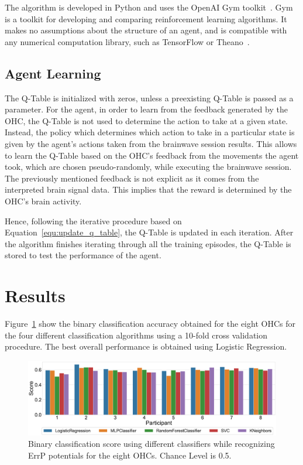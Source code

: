 \documentclass[journal]{IEEEtran}
\begin{document}
{{The algorithm is developed in Python and uses the OpenAI Gym toolkit~\cite{openai}. Gym is a toolkit for developing and comparing reinforcement learning algorithms. It makes no assumptions about the structure of an agent, and is compatible with any numerical computation library, such as TensorFlow or Theano~\cite{tensorflow2015-whitepaper}.

\subsection{Agent Learning}
\label{q_learning_step_alg}
The Q-Table is initialized with zeros, unless a preexisting Q-Table is passed as a parameter.  For the agent, in order to learn from the feedback generated by the OHC, the Q-Table is not used to determine the action to take at a given state. Instead, the policy which determines which action to take in a particular state is given by the agent's actions taken from the brainwave session results. This allows to learn the Q-Table based on the OHC's feedback from the movements the agent took, which are chosen pseudo-randomly, while executing the brainwave session. The previously mentioned feedback is not explicit as it comes from the interpreted brain signal data. This implies that the reward is determined by the OHC's brain activity. 

Hence, following the iterative procedure based on Equation~\ref{equ:update_q_table}, the Q-Table is updated in each iteration.  After the algorithm finishes iterating through all the training episodes, the Q-Table is stored to test the performance of the agent.


\section{Results}
\label{results}

Figure~\ref{fig:classifiers} show the binary classification accuracy obtained for the eight OHCs for the four different classification algorithms using a 10-fold cross validation procedure.  The best overall performance is obtained using Logistic Regression.

\begin{figure}[ht]
    \centering
    \includegraphics[scale=0.14]{revisedimages/cross_val.eps}
    \caption{Binary classification score using different classifiers while recognizing ErrP potentials for the eight OHCs.  Chance Level is 0.5.}
    \label{fig:classifiers}
\end{figure}

}}
\end{document}
